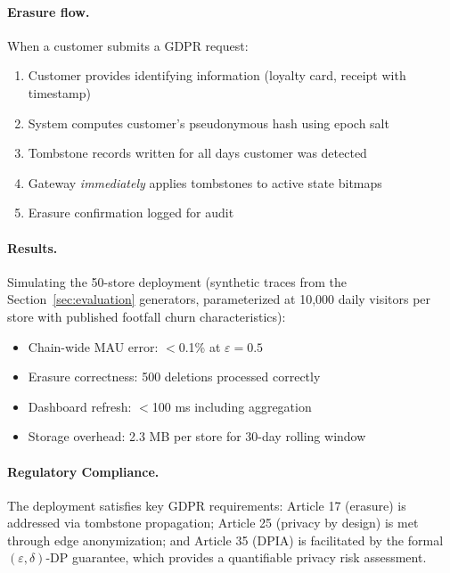 \documentclass[sigconf,anonymous,review]{acmart}
\begin{document}
\paragraph{Erasure flow.}

When a customer submits a GDPR request:
\begin{enumerate}
    \item Customer provides identifying information (loyalty card, receipt with timestamp)
    \item System computes customer's pseudonymous hash using epoch salt
    \item Tombstone records written for all days customer was detected
    \item Gateway \textit{immediately} applies tombstones to active state bitmaps
    \item Erasure confirmation logged for audit
\end{enumerate}

\paragraph{Results.}
Simulating the 50-store deployment (synthetic traces from the Section~\ref{sec:evaluation} generators, parameterized at 10{,}000 daily visitors per store with published footfall churn characteristics):
\begin{itemize}
    \item Chain-wide MAU error: $<$0.1\% at $\varepsilon = 0.5$
    \item Erasure correctness: 500 deletions processed correctly
    \item Dashboard refresh: $<$100 ms including aggregation
    \item Storage overhead: 2.3 MB per store for 30-day rolling window
\end{itemize}

\paragraph{Regulatory Compliance.} The deployment satisfies key GDPR requirements: Article 17 (erasure) is addressed via tombstone propagation; Article 25 (privacy by design) is met through edge anonymization; and Article 35 (DPIA) is facilitated by the formal $(\varepsilon, \delta)$-DP guarantee, which provides a quantifiable privacy risk assessment.
\end{document}
